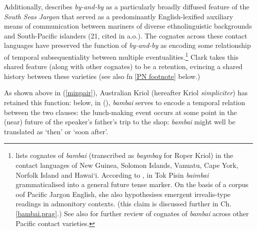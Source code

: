 Additionally, \citet{Clark1979} describes \textit{by-and-by} as a particularly broadly diffused feature of the \textit{South Seas Jargon} that served as a predominantly English-lexified auxiliary means of communication between mariners of diverse ethnolinguistic backgrounds and South-Pacific islanders (21, cited in \citealt[262\textit{ff}]{Harris1986a} a.o.). The cognates across these contact languages have preserved the function of \textit{by-and-by} as encoding some relationship of temporal subsequentiality between multiple eventualities.\footnote{\citet[10-11]{Clark1979} lists cognates of \textit{bambai} (transcribed as \textit{baymbay} for Roper Kriol) in the contact languages of New Guinea, Solomon Islands, Vanuatu, Cape York, Norfolk Island and Hawai`i. According to \citet{Romaine1995}, in Tok Pisin \textit{baimbai} grammaticalised into a general future tense marker. On the basis of a corpus oof Pacific Jargon English, she also hypothesises emergent irrealis-type readings in admonitory contexts. (this claim is discussed further in Ch. \ref{bambai.prag}.) See also \citealt{Angelo2016} for further review of cognates of \textit{bambai} across other Pacific contact varieties.} Clark takes this shared feature (along with other cognates) to be a retention, evincing a shared history between these varieties (see also fn \ref{PN footnote} below.) 

As shown above in (\ref{minpair}), Australian Kriol (hereafter Kriol \textit{simpliciter}) has retained this function: below, in (), \textit{bambai} serves to encode a temporal relation between the two clauses: the lunch-making event occurs at some point in the (near) future of the speaker's father's trip to the shop: \textit{bambai }might well be translated as `then' or `soon after'.

